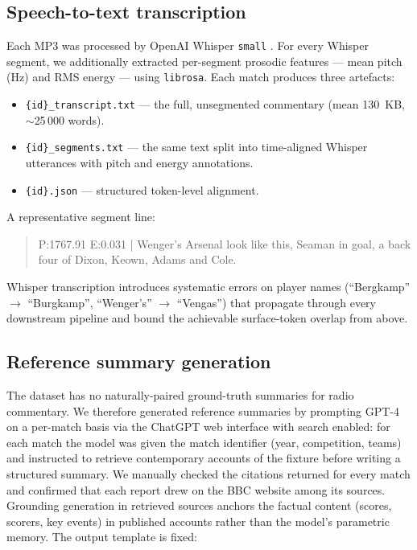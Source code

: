 \documentclass[10pt,a4paper]{article}
\begin{document}
\subsection{Speech-to-text transcription}
Each MP3 was processed by OpenAI Whisper \texttt{small} \citep{radford2023whisper}. For every Whisper segment, we additionally extracted per-segment prosodic features --- mean pitch (Hz) and RMS energy --- using \texttt{librosa}. Each match produces three artefacts:

\begin{itemize}[leftmargin=*,itemsep=2pt,topsep=2pt]
\item \texttt{\{id\}\_transcript.txt} --- the full, unsegmented commentary (mean 130~KB, $\sim$25\,000 words).
\item \texttt{\{id\}\_segments.txt} --- the same text split into time-aligned Whisper utterances with pitch and energy annotations.
\item \texttt{\{id\}.json} --- structured token-level alignment.
\end{itemize}

A representative segment line:
\begin{quote}
\small\ttfamily
[0.00 - 6.80] P:1767.91 E:0.031 | Wenger's Arsenal look like this, Seaman in goal, a back four of Dixon, Keown, Adams and Cole.
\end{quote}

Whisper transcription introduces systematic errors on player names (``Bergkamp'' $\to$ ``Burgkamp'', ``Wenger's'' $\to$ ``Vengas'') that propagate through every downstream pipeline and bound the achievable surface-token overlap from above.

\subsection{Reference summary generation}
\label{sec:gpt_targets}
The dataset has no naturally-paired ground-truth summaries for radio commentary. We therefore generated reference summaries by prompting GPT-4 \citep{openai2023gpt4} on a per-match basis via the ChatGPT web interface with search enabled: for each match the model was given the match identifier (year, competition, teams) and instructed to retrieve contemporary accounts of the fixture before writing a structured summary. We manually checked the citations returned for every match and confirmed that each report drew on the BBC website among its sources. Grounding generation in retrieved sources anchors the factual content (scores, scorers, key events) in published accounts rather than the model's parametric memory. The output template is fixed:
\end{document}

